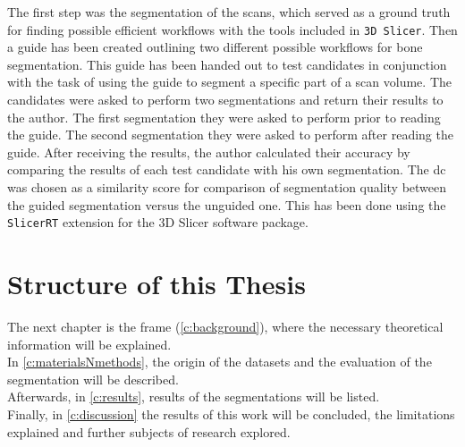 \noindent
The first step was the segmentation of the \mct\space scans, which served as a ground truth for finding possible efficient workflows with the tools included in \texttt{3D Slicer}.
Then a guide has been created outlining two different possible workflows for bone segmentation.
This guide has been handed out to test candidates in conjunction with the task of using the guide to segment a specific part of a scan volume.
The candidates were asked to perform two segmentations and return their results to the author.
The first segmentation they were asked to perform prior to reading the guide.
The second segmentation they were asked to perform after reading the guide.
After receiving the results, the author calculated their accuracy by comparing the results of each test candidate with his own segmentation.
The \acrfull{dc} \cite{diceMeasuresAmountEcologic1945} was chosen as a similarity score for comparison of segmentation quality between the guided segmentation versus the unguided one.
This has been done using the \texttt{SlicerRT} \cite{pinterSlicerRTRadiationTherapy2012} extension for the 3D Slicer software package.


\section{Structure of this Thesis}\label{s:introduction-structureofthisthesis}
The next chapter is the frame (\cref{c:background}), where the necessary theoretical information will be explained.\\
In \cref{c:materialsNmethods}, the origin of the datasets and the evaluation of the segmentation will be described.\\
Afterwards, in \cref{c:results}, results of the segmentations will be listed.\\
Finally, in \cref{c:discussion} the results of this work will be concluded,
the limitations explained and further subjects of research explored.
